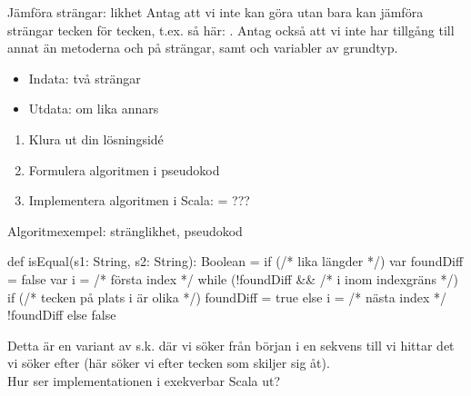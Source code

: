 \begin{Slide}{Jämföra strängar: likhet}\SlideFontSmall
Antag att vi inte kan göra  utan bara kan jämföra strängar tecken för tecken,
t.ex. så här: . Antag också att vi inte har tillgång till annat än metoderna  och  på strängar, samt   och variabler av grundtyp. 

\pause
\begin{itemize}
\item Indata: två strängar
\item Utdata:  om lika annars 
\end{itemize}
\begin{enumerate}
\item Klura ut din lösningsidé
\item Formulera algoritmen i pseudokod
\item Implementera algoritmen i Scala:  = ???
\end{enumerate}
\end{Slide}

\begin{Slide}{Algoritmexempel: stränglikhet, pseudokod}
\begin{Code}
def isEqual(s1: String, s2: String): Boolean = {
  if (/* lika längder */) {
    var foundDiff = false
    var i = /* första index */
    while (!foundDiff && /* i inom indexgräns */) {
      if (/* tecken på plats i är olika */) foundDiff = true
      else i = /* nästa index */
    }
    !foundDiff
  } else false
}
\end{Code}

\pause Detta är en variant av s.k.  där vi söker från början i en sekvens till vi hittar det vi söker efter (här söker vi efter tecken som skiljer sig åt).
\\\pause\vspace{2.5em} Hur ser implementationen i exekverbar Scala ut?
\end{Slide}

